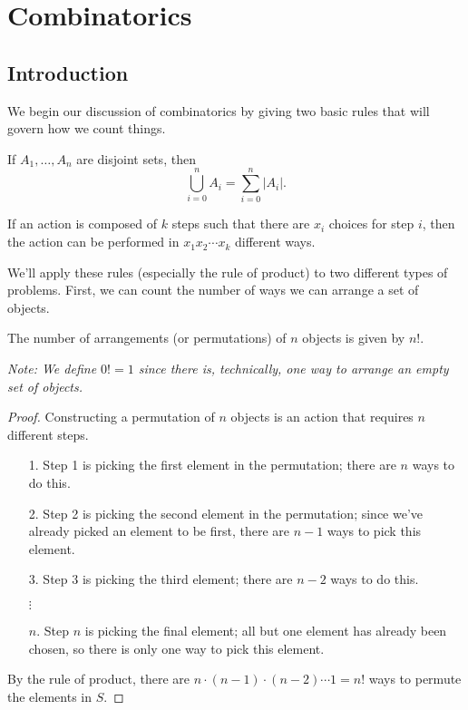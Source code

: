 \documentclass[../m055main.tex]{subfiles}
\begin{document}
\chapter{Combinatorics}

\section{Introduction}
We begin our discussion of combinatorics by giving two basic rules that will govern how we count things.

\begin{theorem}
    If $A_1, \ldots, A_n$ are disjoint sets, then
    \[ \bigcup_{i=0}^n A_i = \sum_{i=0}^n |A_i|. \]
\end{theorem}

\begin{theorem}
    If an action is composed of $k$ steps such that there are $x_i$ choices for step $i$, then the action can be performed in $x_1 x_2 \cdots x_k$ different ways.
\end{theorem}

We'll apply these rules (especially the rule of product) to two different types of problems.
First, we can count the number of ways we can arrange a set of objects.

\begin{theorem}
    The number of arrangements (or permutations) of $n$ objects is given by $n!$. %

    \medskip
    \textit{Note: We define $0! = 1$ since there is, technically, one way to arrange an empty set of objects.}
\end{theorem}

\begin{proof}
    Constructing a permutation of $n$ objects is an action that requires $n$ different steps.
    \begin{itemize}
        \item [1.] Step 1 is picking the first element in the permutation; there are $n$ ways to do this.
        \item [2.] Step 2 is picking the second element in the permutation; since we've already picked an element to be first, there are $n-1$ ways to pick this element.
        \item [3.] Step 3 is picking the third element; there are $n-2$ ways to do this.
        \item [$\vdots$\phantom{.}]
        \item [$n$.] Step $n$ is picking the final element; all but one element has already been chosen, so there is only one way to pick this element.
    \end{itemize}
    By the rule of product, there are $n \cdot (n-1) \cdot (n-2) \cdots 1 = n!$ ways to permute the elements in $S$.
\end{proof}
\end{document}
